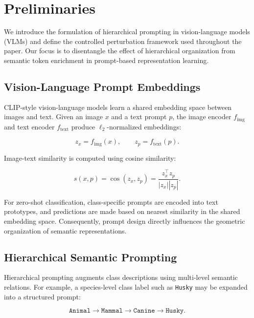 \section{Preliminaries}
\label{sec:preliminaries}

We introduce the formulation of hierarchical prompting in vision-language models (VLMs) and define the controlled perturbation framework used throughout the paper. Our focus is to disentangle the effect of hierarchical organization from semantic token enrichment in prompt-based representation learning.

\subsection{Vision-Language Prompt Embeddings}

CLIP-style vision-language models learn a shared embedding space between images and text. Given an image $x$ and a text prompt $p$, the image encoder $f_{\mathrm{img}}$ and text encoder $f_{\mathrm{text}}$ produce $\ell_2$-normalized embeddings:

\begin{equation}
z_x = f_{\mathrm{img}}(x), \qquad
z_p = f_{\mathrm{text}}(p).
\end{equation}

Image-text similarity is computed using cosine similarity:

\begin{equation}
s(x,p) = \cos(z_x, z_p)
= \frac{z_x^\top z_p}{|z_x| |z_p|}.
\end{equation}

For zero-shot classification, class-specific prompts are encoded into text prototypes, and predictions are made based on nearest similarity in the shared embedding space. Consequently, prompt design directly influences the geometric organization of semantic representations.

\subsection{Hierarchical Semantic Prompting}

Hierarchical prompting augments class descriptions using multi-level semantic relations. For example, a species-level class label such as \texttt{Husky} may be expanded into a structured prompt:

\begin{equation}
\texttt{Animal} \rightarrow
\texttt{Mammal} \rightarrow
\texttt{Canine} \rightarrow
\texttt{Husky}.
\end{equation}

